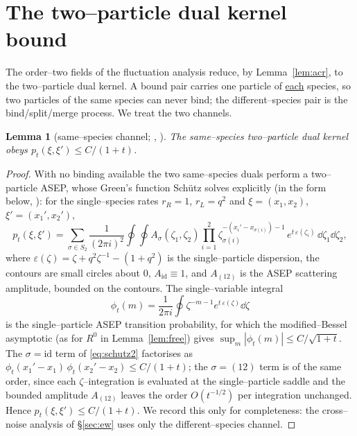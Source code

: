 \documentclass[11pt]{article}
\theoremstyle{plain}
\newtheorem{lemma}[theorem]{Lemma}
\theoremstyle{definition}
\theoremstyle{remark}
\begin{document}
\section{The two--particle dual kernel bound}\label{sec:kernel}

The order--two fields of the fluctuation analysis reduce, by Lemma~\ref{lem:acr}, to
the two--particle dual kernel. A bound pair carries one particle of \underline{each}
species, so two particles of the same species can never bind; the different--species
pair is the bind/split/merge process. We treat the two channels.

\begin{lemma}[same--species channel; {\cite{Schutz}}, {\cite{TW08}}]\label{lem:asep}
The same--species two--particle dual kernel obeys $p_t(\xi,\xi')\le C/(1+t)$.
\end{lemma}
\begin{proof}
With no binding available the two same--species duals perform a two--particle ASEP, whose
Green's function Sch\"utz solves explicitly \cite{Schutz} (in the form below, \cite{TW08}):
for the single--species rates $r_R=1$, $r_L=q^2$ and $\xi=(x_1,x_2)$, $\xi'=(x_1',x_2')$,
\begin{equation}\label{eq:schutz2}
  p_t(\xi,\xi')=\sum_{\sigma\in S_2}\frac1{(2\pi i)^2}\oint\!\!\oint
  A_\sigma(\zeta_1,\zeta_2)\prod_{i=1}^2
  \zeta_{\sigma(i)}^{-(x_i'-x_{\sigma(i)})-1}\,e^{t\,\varepsilon(\zeta_i)}\,\dd\zeta_1\dd\zeta_2,
\end{equation}
where $\varepsilon(\zeta)=\zeta+q^2\zeta^{-1}-(1+q^2)$ is the single--particle dispersion,
the contours are small circles about $0$, $A_{\mathrm{id}}\equiv1$, and $A_{(12)}$ is the
ASEP scattering amplitude, bounded on the contours. The single--variable integral
\[
  \phi_t(m)=\frac1{2\pi i}\oint \zeta^{-m-1}e^{t\,\varepsilon(\zeta)}\dd\zeta
\]
is the single--particle ASEP transition probability, for which the modified--Bessel
asymptotic (as for $R^0$ in Lemma~\ref{lem:free}) gives $\sup_m|\phi_t(m)|\le C/\sqrt{1+t}$.
The $\sigma=\mathrm{id}$ term of \eqref{eq:schutz2} factorises as
$\phi_t(x_1'-x_1)\,\phi_t(x_2'-x_2)\le C/(1+t)$; the $\sigma=(12)$ term is of the same
order, since each $\zeta$--integration is evaluated at the single--particle saddle and the
bounded amplitude $A_{(12)}$ leaves the order $O(t^{-1/2})$ per integration unchanged.
Hence $p_t(\xi,\xi')\le C/(1+t)$. We record this only for completeness: the cross--noise
analysis of \S\ref{sec:ew} uses only the different--species channel.
\end{proof}
\end{document}
